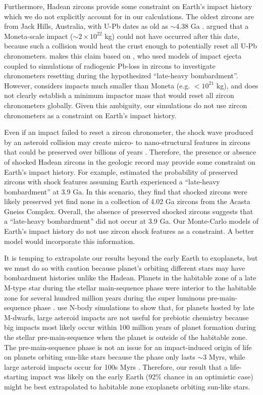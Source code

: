 \documentclass[manuscript]{aastex63}
\begin{document}
Furthermore, Hadean zircons provide some constraint on Earth's impact history which we do not explicitly account for in our calculations. The oldest zircons are from Jack Hills, Australia, with U-Pb dates as old as $\sim 4.38$ Ga \citep{Valley_2014}. \citet{Benner_2020} argued that a Moneta-scale impact ($\sim 2 \times 10^{22}$ kg) could not have occurred after this date, because such a collision would heat the crust enough to potentially reset all U-Pb chronometers. \citet{Benner_2020} makes this claim based on \citet{Abramov_2013}, who used models of impact ejecta coupled to simulations of radiogenic Pb-loss in zircons to investigate chronometers resetting during the hypothesized ``late-heavy bombardment''. However, \citet{Abramov_2013} considers impacts much smaller than Moneta (e.g. $< 10^{21}$ kg), and does not clearly establish a minimum impactor mass that would reset all zircon chronometers globally. Given this ambiguity, our simulations do not use zircon chronometers as a constraint on Earth's impact history.

Even if an impact failed to reset a zircon chronometer, the shock wave produced by an asteroid collision may create micro- to nano-structural features in zircons that could be preserved over billions of years \citep{Reimink_2023}. Therefore, the presence or absence of shocked Hadean zircons in the geologic record may provide some constraint on Earth's impact history. For example, \citet{Reimink_2023} estimated the probability of preserved zircons with shock features assuming Earth experienced a ``late-heavy bombardment'' at 3.9 Ga. In this scenario, they find that shocked zircons were likely preserved yet find none in a collection of 4.02 Ga zircons from the Acasta Gneiss Complex. Overall, the absence of preserved shocked zircons suggests that a ``late-heavy bombardment'' did not occur at 3.9 Ga. Our Monte-Carlo models of Earth's impact history do not use zircon shock features as a constraint. A better model would incorporate this information.

It is temping to extrapolate our results beyond the early Earth to exoplanets, but we must do so with caution because planet's orbiting different stars may have bombardment histories unlike the Hadean. Planets in the habitable zone of a late M-type star during the stellar main-sequence phase were interior to the habitable zone for several hundred million years during the super luminous pre-main-sequence phase \citep{Luger_2015}. \citet{Lichtenberg_2022} use N-body simulations to show that, for planets hosted by late M-dwarfs, large asteroid impacts are not useful for prebiotic chemistry because big impacts most likely occur within 100 million years of planet formation during the stellar pre-main-sequence when the planet is outside of the habitable zone. The pre-main-sequence phase is not an issue for an impact-induced origin of life on planets orbiting sun-like stars because the phase only lasts $\sim 3$ Myrs, while large asteroid impacts occur for 100s Myrs \citep{Lichtenberg_2022}. Therefore, our result that a life-starting impact was likely on the early Earth (92\% chance in an optimistic case) might be best extrapolated to habitable zone exoplanets orbiting sun-like stars.
\end{document}
